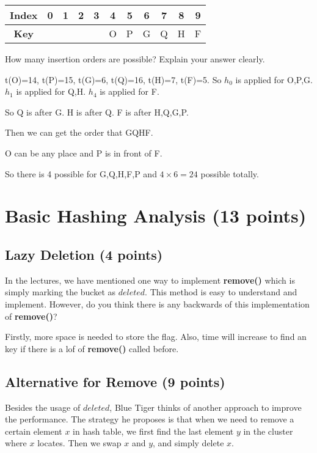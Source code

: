 \documentclass[11pt]{exam}
\begin{document}
\begin{table}[H]
    \centering
    \setlength{\tabcolsep}{5.5mm}
    \begin{tabular}{|c|c|c|c|c|c|c|c|c|c|c|}
        \hline
        \textbf{Index} & 0 & 1 & 2 & 3 & 4 & 5 & 6 & 7 & 8 & 9 \\
        \hline
        \textbf{Key}   &   &   &   &   & O & P & G & Q & H & F \\
        \hline
    \end{tabular}
\end{table}
How many insertion orders are possible? Explain your answer clearly.

\begin{solution}
    t(O)=14,
    t(P)=15,
    t(G)=6,
    t(Q)=16,
    t(H)=7,
    t(F)=5.
    So $h_0$ is applied for O,P,G.
    $h_1$ is applied for Q,H.
    $h_4$ is applied for F.

    So Q is after G. H is after Q. F is after H,Q,G,P.

    Then we can get the order that GQHF.

    O can be any place and P is in front of F.

    So there is 4 possible for G,Q,H,F,P and $4 \times 6=24$ possible totally.

\end{solution}

\section{Basic Hashing Analysis (13 points)}
\subsection{Lazy Deletion (4 points)}
In the lectures, we have mentioned one way to implement \textbf{remove()} which is simply marking the bucket as $deleted$. This method is easy to understand and implement. However, do you think there is any backwards of this implementation of \textbf{remove()}?

\begin{solution}
    Firstly, more space is needed to store the flag. Also, time will increase to find an key if there is a lof of \textbf{remove()} called before.
\end{solution}

\subsection{Alternative for Remove (9 points)}
Besides the usage of $deleted$, Blue Tiger thinks of another approach to improve the performance. The strategy he proposes is that when we need to remove a certain element $x$ in hash table, we first find the last element $y$ in the cluster where $x$ locates. Then we swap $x$ and $y$, and simply delete $x$.
\end{document}
